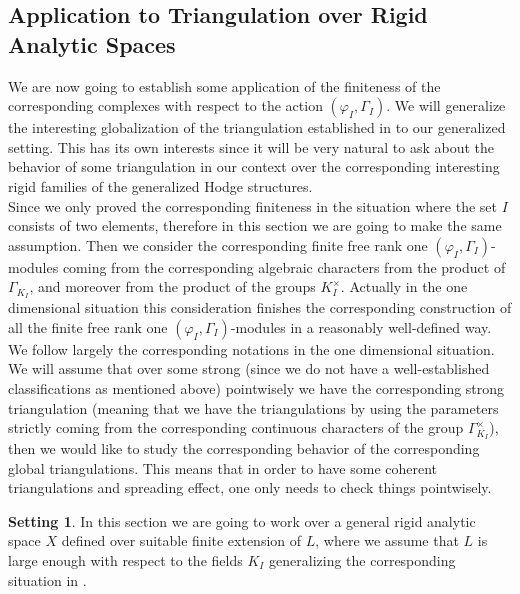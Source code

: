 \documentclass[12pt]{amsart}
\theoremstyle{definition}
\numberwithin{equation}{section}
\newtheorem{setting}[theorem]{Setting}
\begin{document}
\subsection{Application to Triangulation over Rigid Analytic Spaces} \label{triangulation}


\noindent We are now going to establish some application of the finiteness of the corresponding complexes with respect to the action $(\varphi_I,\Gamma_I)$. We will generalize the interesting globalization of the triangulation established in \cite{KPX} to our generalized setting. This has its own interests since it will be very natural to ask about the behavior of some triangulation in our context over the corresponding interesting rigid families of the generalized Hodge structures.\\


\indent Since we only proved the corresponding finiteness in the situation where the set $I$ consists of two elements, therefore in this section we are going to make the same assumption. Then we consider the corresponding finite free rank one $(\varphi_I,\Gamma_I)$-modules coming from the corresponding algebraic characters from the product of $\Gamma_{K_I}$, and moreover from the product of the groups $K_I^\times$. Actually in the one dimensional situation this consideration finishes the corresponding construction of all the finite free rank one $(\varphi_I,\Gamma_I)$-modules in a reasonably well-defined way. We follow largely the corresponding notations in the one dimensional situation. We will assume that over some strong (since we do not have a well-established classifications as mentioned above) pointwisely we have the corresponding strong triangulation (meaning that we have the triangulations by using the parameters strictly coming from the corresponding continuous characters of the group $\Gamma_{K_I}^\times$), then we would like to study the corresponding behavior of the corresponding global triangulations. This means that in order to have some coherent triangulations and spreading effect, one only needs to check things pointwisely.\\






\begin{setting}
In this section we are going to work over a general rigid analytic space $X$ defined over suitable finite extension of $L$, where we assume that $L$ is large enough with respect to the fields $K_I$ generalizing the corresponding situation in \cite[Chapter 6]{KPX}.	
\end{setting}
\end{document}
